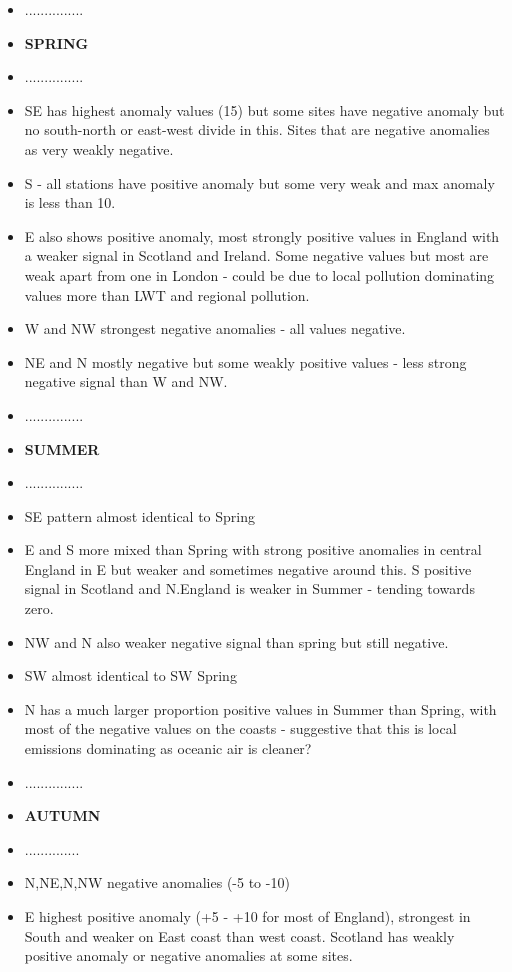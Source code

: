 \documentclass[10pt]{article}
\begin{document}
\begin{itemize}
\item ...............
\item \textbf{SPRING}
\item ...............
\item SE has highest anomaly values (15) but some sites have negative anomaly but no south-north or east-west divide in this. Sites that are negative anomalies as very weakly negative. 
\item S - all stations have positive anomaly but some very weak and max anomaly is less than 10.
\item E also shows positive anomaly, most strongly positive values in England with a weaker signal in Scotland and Ireland. Some negative values but most are weak apart from one in London - could be due to local pollution dominating values more than LWT and regional pollution. 
\item W and NW strongest negative anomalies - all values negative. 
\item NE and N mostly negative but some weakly positive values - less strong negative signal than W and NW.
\item ...............
\item \textbf{SUMMER}
\item ...............
\item SE pattern almost identical to Spring
\item E and S more mixed than Spring with strong positive anomalies in central England in E but weaker and sometimes negative around this. S positive signal in Scotland and N.England is weaker in Summer - tending towards zero. 
\item NW and N also weaker negative signal than spring but still negative.
\item SW almost identical to SW Spring 
\item N has a much larger proportion positive values in Summer  than Spring, with most of the negative values on the coasts - suggestive that this is local emissions dominating as oceanic air is cleaner?
\item ...............
\item \textbf{AUTUMN}
\item ..............
\item N,NE,N,NW negative anomalies (-5 to -10)
\item E highest positive anomaly (+5 - +10 for most of England), strongest in South and weaker on East coast than west coast. Scotland has weakly positive anomaly or negative anomalies at some sites.

\end{itemize}
\end{document}

